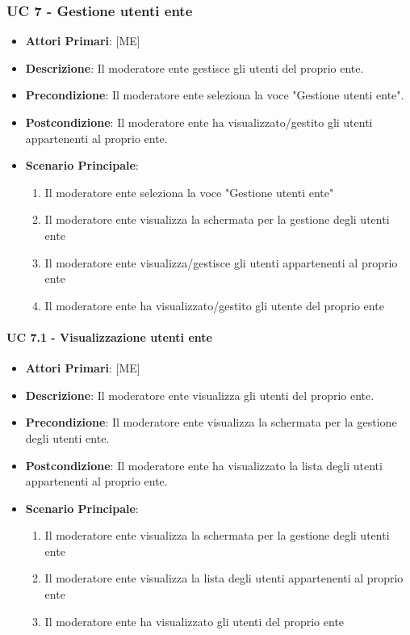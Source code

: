 		\subsubsection{UC 7 - Gestione utenti ente}
		
		
		
		\begin{itemize}
			\item \textbf{Attori Primari}: [ME]
			\item \textbf{Descrizione}: Il moderatore ente gestisce gli utenti del proprio ente.
			\item \textbf{Precondizione}: Il moderatore ente seleziona la voce "Gestione utenti ente".
			\item \textbf{Postcondizione}: Il moderatore ente ha visualizzato/gestito gli utenti appartenenti al proprio ente.
			\item \textbf{Scenario Principale}:
			\begin{enumerate}
				\item{Il moderatore ente seleziona la voce "Gestione utenti ente"}
				\item{Il moderatore ente visualizza la schermata per la gestione degli utenti ente}
				\item{Il moderatore ente visualizza/gestisce gli utenti appartenenti al proprio ente}
				\item{Il moderatore ente ha visualizzato/gestito gli utente del proprio ente}
			\end{enumerate}	
		\end{itemize}
			
			\paragraph{UC 7.1 - Visualizzazione utenti ente}
			\begin{itemize}
				\item \textbf{Attori Primari}: [ME]
				\item \textbf{Descrizione}: Il moderatore ente visualizza gli utenti del proprio ente.
				\item \textbf{Precondizione}: Il moderatore ente visualizza la schermata per la gestione degli utenti ente.
				\item \textbf{Postcondizione}: Il moderatore ente ha visualizzato la lista degli utenti appartenenti al proprio ente.
				\item \textbf{Scenario Principale}:
				\begin{enumerate}
					\item{Il moderatore ente visualizza la schermata per la gestione degli utenti ente}
					\item{Il moderatore ente visualizza la lista degli utenti appartenenti al proprio ente}
					\item{Il moderatore ente ha visualizzato gli utenti del proprio ente}
				\end{enumerate}	
			\end{itemize}
			
